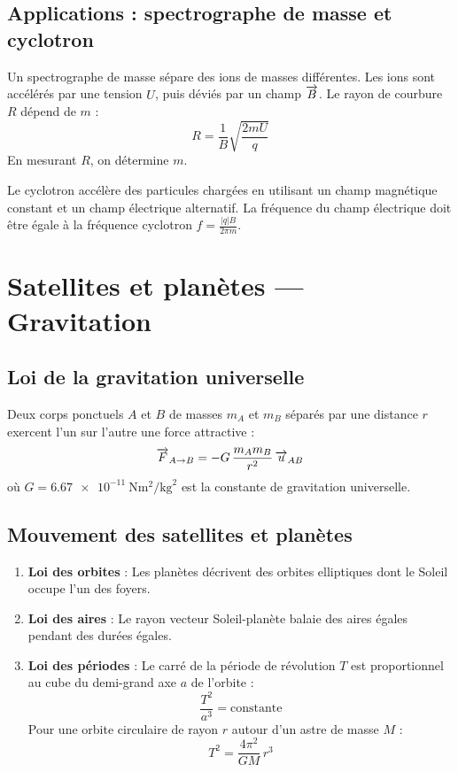 \subsection{Applications : spectrographe de masse et cyclotron}

\begin{experience}
Un spectrographe de masse sépare des ions de masses différentes. Les ions sont accélérés par une tension $U$, puis déviés par un champ $\overrightarrow{B}$. Le rayon de courbure $R$ dépend de $m$ :
\[
R = \frac{1}{B}\sqrt{\frac{2mU}{q}}
\]
En mesurant $R$, on détermine $m$.
\end{experience}

\begin{experience}[Cyclotron]
Le cyclotron accélère des particules chargées en utilisant un champ magnétique constant et un champ électrique alternatif. La fréquence du champ électrique doit être égale à la fréquence cyclotron $f = \frac{|q|B}{2\pi m}$.
\end{experience}

\section{Satellites et planètes — Gravitation}

\subsection{Loi de la gravitation universelle}

\begin{loi}
Deux corps ponctuels $A$ et $B$ de masses $m_A$ et $m_B$ séparés par une distance $r$ exercent l'un sur l'autre une force attractive :
\[
\overrightarrow{F}_{A\to B} = -G\,\frac{m_A m_B}{r^2}\,\overrightarrow{u}_{AB}
\]
où $G=\SI{6.67e-11}{\newton\metre\squared\per\kilogram\squared}$ est la constante de gravitation universelle.
\end{loi}

\subsection{Mouvement des satellites et planètes}

\begin{loi}
\begin{enumerate}
\item \textbf{Loi des orbites} : Les planètes décrivent des orbites elliptiques dont le Soleil occupe l'un des foyers.
\item \textbf{Loi des aires} : Le rayon vecteur Soleil-planète balaie des aires égales pendant des durées égales.
\item \textbf{Loi des périodes} : Le carré de la période de révolution $T$ est proportionnel au cube du demi-grand axe $a$ de l'orbite :
\[
\frac{T^2}{a^3} = \text{constante}
\]
Pour une orbite circulaire de rayon $r$ autour d'un astre de masse $M$ :
\[
T^2 = \frac{4\pi^2}{GM}\,r^3
\]
\end{enumerate}
\end{loi}

